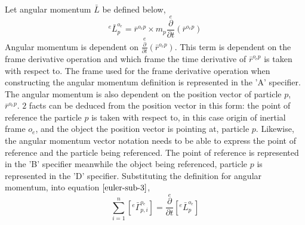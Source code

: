 \documentclass[class=report, 12pt, crop=false]{standalone}
\begin{document}
\begin{center}
Let angular momentum $\bar{L}$ be defined below,
$${}^{e}\bar{L}^{o_{e}}_{p} = \bar{r}^{o_{e}p}\times m_{p}\overset{e}{\frac{\partial}{\partial t}}\left(\bar{r}^{o_{e}p}\right)$$
Angular momentum is dependent on $\displaystyle \overset{e}{\frac{\partial}{\partial t}}\left(\bar{r}^{o_{e}p}\right)$. This term is dependent on the frame derivative operation and which frame the time derivative of $\displaystyle \bar{r}^{o_{e}p}$ is taken with respect to. The frame used for the frame derivative operation when constructing the angular momentum definition is represented in the 'A' specifier. The angular momentum is also dependent on the position vector of particle $p$, $\displaystyle \bar{r}^{o_{e}p}$. $2$ facts can be deduced from the position vector in this form: the point of reference the particle $p$ is taken with respect to, in this case origin of inertial frame $o_{e}$, and the object the position vector is pointing at, particle $p$. Likewise, the angular momentum vector notation needs to be able to express the point of reference and the particle being referenced. The point of reference is represented in the 'B' specifier meanwhile the object being referenced, particle $p$ is represented in the 'D' specifier. Substituting the definition for angular momentum, into equation $\ref{euler-sub-3}$,
$$\sum^{n}_{i = 1}\left[{}^{e}\bar{\Gamma}^{o_{e}}_{p,i}\right] = \overset{e}{\frac{\partial}{\partial t}}\left[{}^{e}\bar{L}^{o_{e}}_{p}\right]$$

\end{center}
\end{document}
